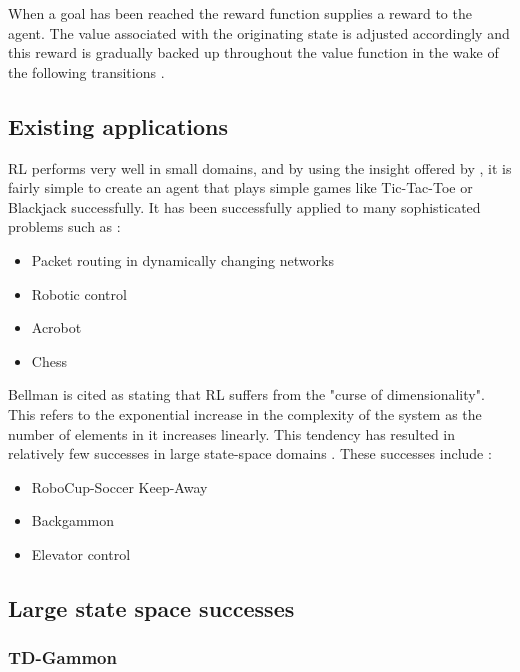 \documentclass{rucsthesis}
\begin{document}
When a goal has been reached the reward function supplies a reward to the agent.  The value associated with the originating state is adjusted accordingly and this reward is gradually backed up throughout the value function in the wake of the following transitions \citep{suttonbarto}.

\subsection{Existing applications}

RL performs very well in small domains, and by using the insight offered by \cite{suttonbarto}, it is fairly simple to create an agent that plays simple games like Tic-Tac-Toe or Blackjack successfully. It has been successfully applied to many sophisticated problems such as :

\begin{itemize}
\item{Packet routing in dynamically changing networks \citep{boyan94packet}}
\item{Robotic control \citep{rlrobotics}}
\item{Acrobot \citep{suttonbarto} }
\item{Chess \citep{baxter98knightcap}}
\end{itemize}

Bellman is cited \citep{suttonbarto} as stating that RL suffers from the "curse of dimensionality".  This refers to the exponential increase in the complexity of the system as the number of elements in it increases linearly. This tendency has resulted in relatively few successes in large state-space domains \citep{keepaway}. These successes include : 

\begin{itemize}
\item{RoboCup-Soccer Keep-Away \citep{keepaway}}
\item{Backgammon \citep{tdgammon}}
\item{Elevator control \citep{elevator}}
\end{itemize}

\subsection{Large state space successes}

\subsubsection{TD-Gammon}
\end{document}
